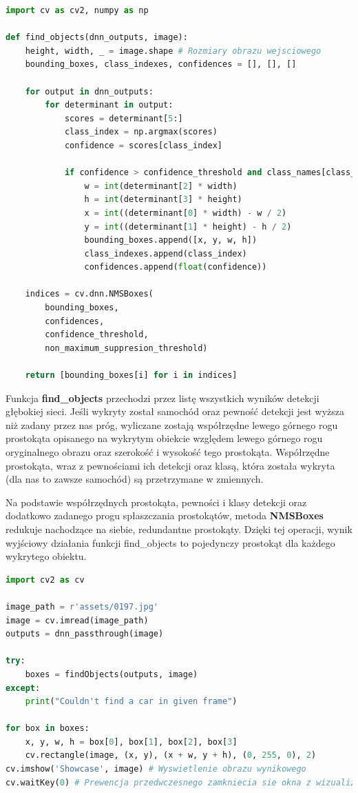 \begin{lstlisting}[language=Python, caption=Znalezienie wymiarów prostokątów opisanych na wykrytych siecią obiektach]
import cv as cv2, numpy as np

def find_objects(dnn_outputs, image):
    height, width, _ = image.shape # Rozmiary obrazu wejsciowego
    bounding_boxes, class_indexes, confidences = [], [], []

    for output in dnn_outputs:
        for determinant in output:
            scores = determinant[5:]
            class_index = np.argmax(scores)
            confidence = scores[class_index]

            if confidence > confidence_threshold and class_names[class_index] == 'car':
                w = int(determinant[2] * width)
                h = int(determinant[3] * height)
                x = int((determinant[0] * width) - w / 2)
                y = int((determinant[1] * height) - h / 2)
                bounding_boxes.append([x, y, w, h])
                class_indexes.append(class_index)
                confidences.append(float(confidence))

    indices = cv.dnn.NMSBoxes(
        bounding_boxes,
        confidences,
        confidence_threshold,
        non_maximum_suppresion_threshold)

    return [bounding_boxes[i] for i in indices]
\end{lstlisting}

\pagebreak

Funkcja \textbf{find\_objects} przechodzi przez listę wszystkich wyników detekcji głębokiej sieci. Jeśli wykryty został samochód oraz pewność detekcji jest wyższa niż zadany przez nas próg, wyliczane zostają współrzędne lewego górnego rogu prostokąta opisanego na wykrytym obiekcie względem lewego górnego rogu oryginalnego obrazu oraz szerokość i wysokość tego prostokąta. Współrzędne prostokąta, wraz z pewnościami ich detekcji oraz klasą, która została wykryta (dla nas to zawsze samochód) są przetrzymane w zmiennych. 

Na podstawie współrzędnych prostokąta, pewności i klasy detekcji oraz dodatkowo zadanego progu spłaszczania prostokątów, metoda \textbf{NMSBoxes} redukuje nachodzące na siebie, redundantne prostokąty. Dzięki tej operacji, wynik wyjściowy działania funkcji find\_objects to pojedynczy prostokąt dla każdego wykrytego obiektu.

\begin{lstlisting}[language=Python, caption=Użycie zaimplementowanej detekcji i jej wizualizacja]
import cv2 as cv

image_path = r'assets/0197.jpg'
image = cv.imread(image_path)
outputs = dnn_passthrough(image)

try:
    boxes = findObjects(outputs, image)
except:
    print("Couldn't find a car in given frame")
    
for box in boxes:
    x, y, w, h = box[0], box[1], box[2], box[3]
    cv.rectangle(image, (x, y), (x + w, y + h), (0, 255, 0), 2)
cv.imshow('Showcase', image) # Wyswietlenie obrazu wynikowego
cv.waitKey(0) # Prewencja przedwczesnego zamkniecia sie okna z wizualizacja
\end{lstlisting}

